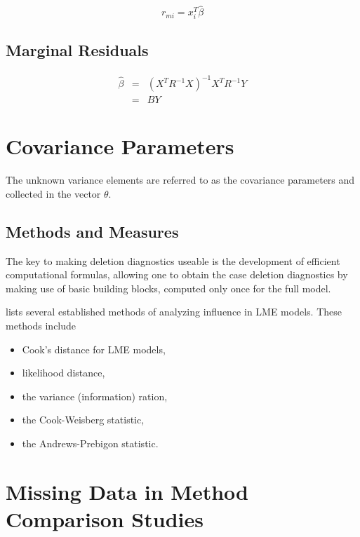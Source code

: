 \documentclass[12pt, a4paper]{report}
\theoremstyle{plain}
\theoremstyle{definition}
\theoremstyle{remark}
\begin{document}
\begin{equation}
r_{mi}=x^{T}_{i}\hat{\beta}
\end{equation}

\subsection{Marginal Residuals}
\begin{eqnarray}
\hat{\beta} &=& (X^{T}R^{-1}X)^{-1}X^{T}R^{-1}Y \nonumber \\
&=& BY \nonumber
\end{eqnarray}


\section{Covariance Parameters} %
The unknown variance elements are referred to as the covariance parameters and collected in the vector $\theta$.


\subsection{Methods and Measures}
The key to making deletion diagnostics useable is the development of efficient computational formulas, allowing one to obtain the  case deletion diagnostics by making use of basic building blocks, computed only once for the full model.

\citet{Zewotir} lists several established methods of analyzing influence in LME models. These methods include \begin{itemize}
	\item Cook's distance for LME models,
	\item {} likelihood distance,
	\item the variance (information) ration,
	\item the  Cook-Weisberg statistic,
	\item the  Andrews-Prebigon statistic.
\end{itemize}


\section{Missing Data in Method Comparison Studies}
\end{document}
